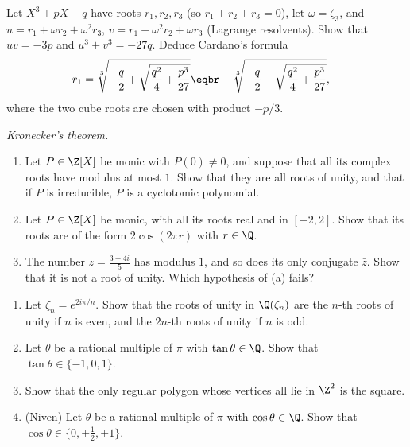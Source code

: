 \begin{exercise}[$\star\star$]\label{ex:cardano}
Let $X^3+pX+q$ have roots $r_1,r_2,r_3$ (so $r_1+r_2+r_3=0$), let $\omega=\zeta_3$, and $u=r_1+\omega r_2+\omega^2r_3$, $v=r_1+\omega^2r_2+\omega r_3$ (Lagrange resolvents). Show that $uv=-3p$ and $u^3+v^3=-27q$. Deduce Cardano's formula
\[
\begin{aligned}r_1&=\sqrt[3]{-\frac q2+\sqrt{\frac{q^2}4+\frac{p^3}{27}}}\eqbr+\sqrt[3]{-\frac q2-\sqrt{\frac{q^2}4+\frac{p^3}{27}}},\end{aligned}
\]
where the two cube roots are chosen with product $-p/3$.
\end{exercise}


\begin{exercise}[$\star\star\star$]\label{pb:kronecker}
\emph{Kronecker's theorem.}
\begin{enumerate}[label=(\alph*)]
\item Let $P\in\Z[X]$ be monic with $P(0)\ne0$, and suppose that all its complex roots have modulus at most $1$. Show
that they are all roots of unity, and that if $P$ is irreducible, $P$ is a cyclotomic polynomial.
\item Let $P\in\Z[X]$ be monic, with all its roots real and in $[-2,2]$. Show that its roots are of the form $2\cos(2\pi r)$
with $r\in\Q$.
\item The number $z=\frac{3+4i}5$ has modulus $1$, and so does its only conjugate $\bar z$. Show that it is not a root of
unity. Which hypothesis of (a) fails?
\end{enumerate}
\end{exercise}

\begin{exercise}[$\star\star$]\label{pb:rattan}
\begin{enumerate}[label=(\alph*)]
\item Let $\zeta_n=e^{2i\pi/n}$. Show that the roots of unity in $\Q(\zeta_n)$ are the $n$-th roots of unity if $n$ is
even, and the $2n$-th roots of unity if $n$ is odd.
\item Let $\theta$ be a rational multiple of $\pi$ with $\tan\theta\in\Q$. Show that $\tan\theta\in\{-1,0,1\}$.
\item Show that the only regular polygon whose vertices all lie in $\Z^2$ is the square.
\item (Niven) Let $\theta$ be a rational multiple of $\pi$ with $\cos\theta\in\Q$. Show that
$\cos\theta\in\{0,\pm\frac12,\pm1\}$.
\end{enumerate}
\end{exercise}

